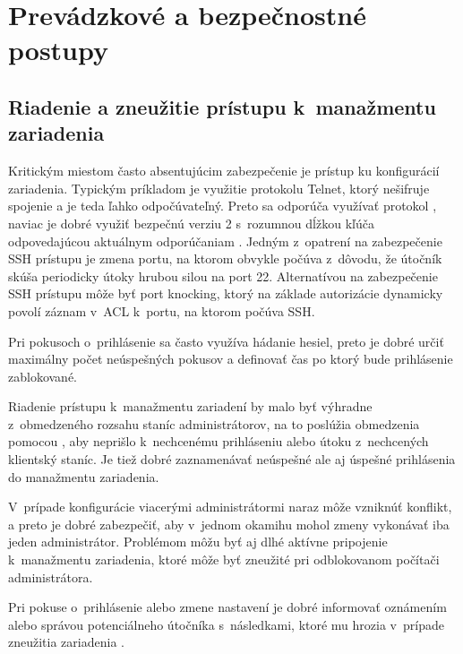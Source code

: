 \section{Prevádzkové a bezpečnostné postupy}

\subsection*{Riadenie a zneužitie prístupu k~manažmentu zariadenia}
Kritickým miestom často absentujúcim zabezpečenie je prístup ku konfigurácií zariadenia. Typickým príkladom je využitie protokolu Telnet, ktorý nešifruje spojenie a je teda ľahko odpočúvateľný. Preto sa odporúča využívať protokol , naviac je dobré využiť bezpečnú verziu 2 s~rozumnou dĺžkou kľúča odpovedajúcou aktuálnym odporúčaniam \cite{CIS_DrTLsgXv24lxeIIM} \cite{Barker2019}. Jedným z~opatrení na zabezpečenie SSH prístupu je zmena portu, na ktorom obvykle počúva z~dôvodu, že útočník skúša periodicky útoky hrubou silou na  port 22. Alternatívou na zabezpečenie SSH prístupu môže byť port knocking, ktorý na základe autorizácie dynamicky povolí záznam v~ACL k~portu, na ktorom počúva SSH.

Pri pokusoch o~prihlásenie sa často využíva hádanie hesiel, preto je dobré určiť maximálny počet neúspešných pokusov a definovať čas po ktorý bude prihlásenie zablokované.

Riadenie prístupu k~manažmentu zariadení by malo byť výhradne z~obmedzeného rozsahu staníc administrátorov, na to poslúžia obmedzenia pomocou , aby neprišlo k~nechcenému prihláseniu alebo útoku  z~nechcených klientský staníc. Je tiež dobré zaznamenávať neúspešné ale aj úspešné prihlásenia do manažmentu zariadenia. 

V~prípade konfigurácie viacerými administrátormi naraz môže vzniknúť konflikt, a preto je dobré zabezpečiť, aby v~jednom okamihu mohol zmeny vykonávať iba jeden administrátor. Problémom môžu byť aj dlhé aktívne pripojenie k~manažmentu zariadenia, ktoré môže byť zneužité pri odblokovanom počítači administrátora. 

Pri pokuse o~prihlásenie alebo zmene nastavení je dobré informovať oznámením alebo správou potenciálneho útočníka s~následkami, ktoré mu hrozia v~prípade zneužitia zariadenia \cite{CIS_DrTLsgXv24lxeIIM}. 

